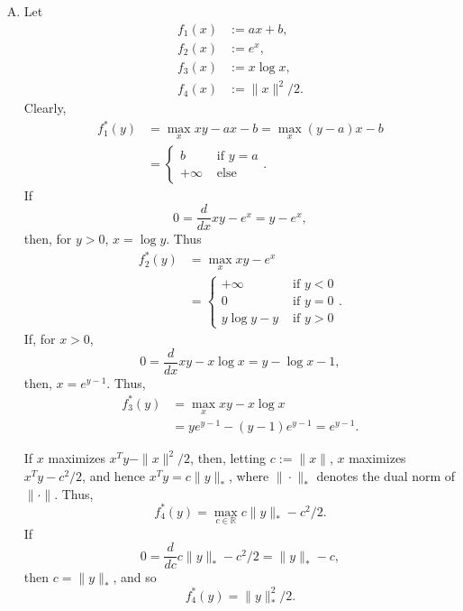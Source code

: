 \documentclass[11pt]{article}
\newcommand{\R}{\mathbb{R}}
\begin{document}
\begin{enumerate}[A.]
\item Let
\begin{align*}
f_1(x) & := ax + b,     \\
f_2(x) & := e^x,        \\
f_3(x) & := x\log x,    \\
f_4(x) & := \|x\|^2/2.
\end{align*}
Clearly,
\begin{align*}
f_1^*(y)
 &  = \max_x xy - ax - b
    = \max_x (y - a)x - b   \\
 &  = \left\{
        \begin{array}{ll}
            b           & \mbox{ if } y = a   \\
            + \infty    & \mbox{ else }
        \end{array}
    \right..
\end{align*}
If
\[0
    = \frac{d}{dx} xy - e^x
    = y - e^x,
\]
then, for $y > 0$, $x = \log y$. Thus
\begin{align*}
f_2^*(y)
 &  = \max_x xy - e^x   \\
 &  = \left\{
        \begin{array}{ll}
            +\infty     & \mbox{ if } y < 0 \\
            0           & \mbox{ if } y = 0 \\
            y \log y - y & \mbox{ if } y > 0
        \end{array}
    \right..
\end{align*}
If, for $x > 0$,
\[0
    = \frac{d}{dx} xy - x \log x
    = y - \log x - 1,
\]
then, $x = e^{y - 1}$. Thus,
\begin{align*}
f_3^*(y)
 &  = \max_x xy - x \log x  \\
 &  = y e^{y - 1} - (y - 1) e^{y - 1}
    = e^{y - 1}.
\end{align*}

If $x$ maximizes $x^Ty - \|x\|^2/2$, then, letting $c := \|x\|$, $x$ maximizes
$x^Ty - c^2/2$, and hence $x^Ty = c\|y\|_*$, where $\|\cdot\|_*$ denotes the
dual norm of $\|\cdot\|$. Thus,
\[f_4^*(y) = \max_{c \in \R} c\|y\|_* - c^2/2.\]
If
\[0
    = \frac{d}{dc} c\|y\|_* - c^2/2
    = \|y\|_* - c,
\]
then $c = \|y\|_*$, and so
\[f_4^*(y) = \|y\|_*^2/2.\]
\end{enumerate}
\end{document}
